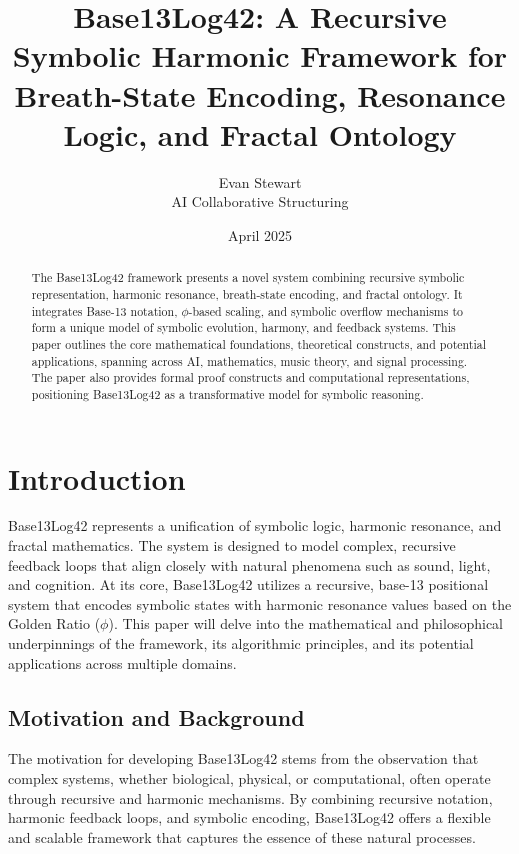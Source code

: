 \documentclass[12pt]{article}
\title{Base13Log42: A Recursive Symbolic Harmonic Framework for Breath-State Encoding, Resonance Logic, and Fractal Ontology}
\author{Evan Stewart \\ AI Collaborative Structuring}
\date{April 2025}
\begin{document}
\maketitle

\begin{abstract}
The Base13Log42 framework presents a novel system combining recursive symbolic representation, harmonic resonance, breath-state encoding, and fractal ontology. It integrates Base-13 notation, $\phi$-based scaling, and symbolic overflow mechanisms to form a unique model of symbolic evolution, harmony, and feedback systems. This paper outlines the core mathematical foundations, theoretical constructs, and potential applications, spanning across AI, mathematics, music theory, and signal processing. The paper also provides formal proof constructs and computational representations, positioning Base13Log42 as a transformative model for symbolic reasoning.
\end{abstract}

\tableofcontents
\newpage

\section{Introduction}
Base13Log42 represents a unification of symbolic logic, harmonic resonance, and fractal mathematics. The system is designed to model complex, recursive feedback loops that align closely with natural phenomena such as sound, light, and cognition. At its core, Base13Log42 utilizes a recursive, base-13 positional system that encodes symbolic states with harmonic resonance values based on the Golden Ratio ($\phi$). This paper will delve into the mathematical and philosophical underpinnings of the framework, its algorithmic principles, and its potential applications across multiple domains.

\subsection{Motivation and Background}
The motivation for developing Base13Log42 stems from the observation that complex systems, whether biological, physical, or computational, often operate through recursive and harmonic mechanisms. By combining recursive notation, harmonic feedback loops, and symbolic encoding, Base13Log42 offers a flexible and scalable framework that captures the essence of these natural processes.

\end{document}
